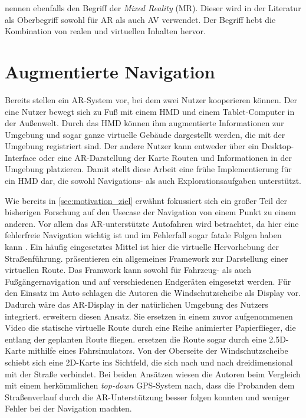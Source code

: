\textcite{Milgram1994} nennen ebenfalls den Begriff der \emph{Mixed Reality} (MR).
Dieser wird in der Literatur als Oberbegriff sowohl für AR als auch AV verwendet.
Der Begriff hebt die Kombination von realen und virtuellen Inhalten hervor.

\section{Augmentierte Navigation}
Bereits \textcite{Hoellerer1999} stellen ein AR-System vor, bei dem zwei Nutzer kooperieren können.
Der eine Nutzer bewegt sich zu Fuß mit einem HMD und einem Tablet-Computer in der Außenwelt.
Durch das HMD können ihm augmentierte Informationen zur Umgebung und sogar ganze virtuelle Gebäude dargestellt werden, die mit der Umgebung registriert sind.
Der andere Nutzer kann entweder über ein Desktop-Interface oder eine AR-Darstellung der Karte Routen und Informationen in der Umgebung platzieren.
Damit stellt diese Arbeit eine frühe Implementierung für ein HMD dar, die sowohl Navigations- als auch Explorationsaufgaben unterstützt.

Wie bereits in \autoref{sec:motivation_ziel} erwähnt fokussiert sich ein großer Teil der bisherigen Forschung auf den Usecase der Navigation von einem Punkt zu einem anderen.
Vor allem das AR-unterstützte Autofahren wird betrachtet, da hier eine fehlerfreie Navigation wichtig ist und im Fehlerfall sogar fatale Folgen haben kann \parencite{Lin2017}.
Ein häufig eingesetztes Mittel ist hier die virtuelle Hervorhebung der Straßenführung.
\textcite{Narzt2006} präsentieren ein allgemeines Framework zur Darstellung einer virtuellen Route.
Das Framwork kann sowohl für Fahrzeug- als auch Fußgängernavigation und auf verschiedenen Endgeräten eingesetzt werden.
Für den Einsatz im Auto schlagen die Autoren die Windschutzscheibe als Display vor.
Dadurch wäre das AR-Display in der natürlichen Umgebung des Nutzers integriert.
\textcite{Bark2014} erweitern diesen Ansatz.
Sie ersetzen in einem zuvor aufgenommenen Video die statische virtuelle Route durch eine Reihe animierter Papierflieger, die entlang der geplanten Route fliegen.
\textcite{Kim2009} ersetzen die Route sogar durch eine 2.5D-Karte mithilfe eines Fahrsimulators.
Von der Oberseite der Windschutzscheibe schiebt sich eine 2D-Karte ins Sichtfeld, die sich nach und nach dreidimensional mit der Straße verbindet.
Bei beiden Ansätzen wiesen die Autoren beim Vergleich mit einem herkömmlichen \emph{top-down} GPS-System nach, dass die Probanden dem Straßenverlauf durch die AR-Unterstützung besser folgen konnten und weniger Fehler bei der Navigation machten.

